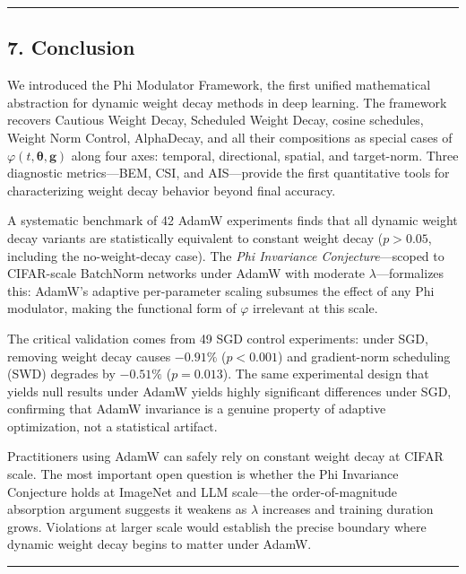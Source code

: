 \documentclass[
]{article}
\begin{document}
\begin{center}\rule{0.5\linewidth}{0.5pt}\end{center}

\hypertarget{conclusion}{%
\subsection{7. Conclusion}\label{conclusion}}

We introduced the Phi Modulator Framework, the first unified
mathematical abstraction for dynamic weight decay methods in deep
learning. The framework recovers Cautious Weight Decay, Scheduled Weight
Decay, cosine schedules, Weight Norm Control, AlphaDecay, and all their
compositions as special cases of
\(\varphi(t, \boldsymbol{\theta}, \mathbf{g})\) along four axes:
temporal, directional, spatial, and target-norm. Three diagnostic
metrics---BEM, CSI, and AIS---provide the first quantitative tools for
characterizing weight decay behavior beyond final accuracy.

A systematic benchmark of 42 AdamW experiments finds that all dynamic
weight decay variants are statistically equivalent to constant weight
decay (\(p > 0.05\), including the no-weight-decay case). The \emph{Phi
Invariance Conjecture}---scoped to CIFAR-scale BatchNorm networks under
AdamW with moderate \(\lambda\)---formalizes this: AdamW's adaptive
per-parameter scaling subsumes the effect of any Phi modulator, making
the functional form of \(\varphi\) irrelevant at this scale.

The critical validation comes from 49 SGD control experiments: under
SGD, removing weight decay causes \(-0.91\%\) (\(p < 0.001\)) and
gradient-norm scheduling (SWD) degrades by \(-0.51\%\) (\(p = 0.013\)).
The same experimental design that yields null results under AdamW yields
highly significant differences under SGD, confirming that AdamW
invariance is a genuine property of adaptive optimization, not a
statistical artifact.

Practitioners using AdamW can safely rely on constant weight decay at
CIFAR scale. The most important open question is whether the Phi
Invariance Conjecture holds at ImageNet and LLM scale---the
order-of-magnitude absorption argument suggests it weakens as
\(\lambda\) increases and training duration grows. Violations at larger
scale would establish the precise boundary where dynamic weight decay
begins to matter under AdamW.

\begin{center}\rule{0.5\linewidth}{0.5pt}\end{center}
\end{document}
